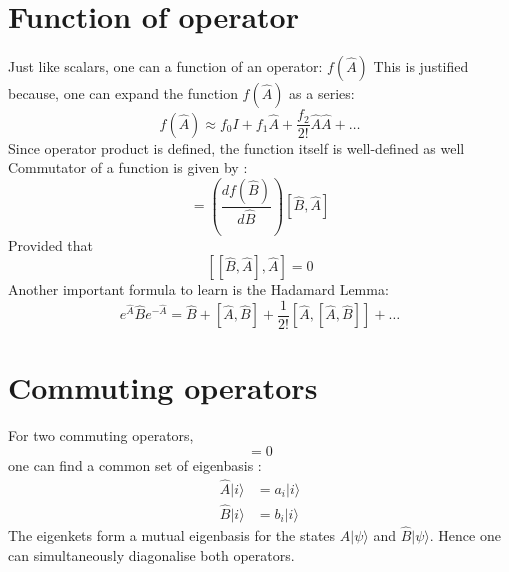  \section{Function of operator}
 Just like scalars, one can a function of an operator: $ f( \hat{A}) $ This is justified because, one can expand the function $ f( \hat{A}) $ as a series:
 \begin{equation}
 f( \hat{A}) \approx f_0I + f_1 \hat{A} + \frac{f_2}{2!} \hat{A}\hat{A} + \dots 
 \end{equation}
 Since operator product is defined, the function itself is well-defined as well\\
 Commutator of a function is given by :
 \begin{equation}
 [f(\hat{B}), \hat{A}] = \left( \dfrac{d f(\hat{B})}{d \hat{B}}\right)  [ \hat{B},\hat{A}]
 \end{equation}
 Provided that \[
 [ [ \hat{B},\hat{A}], \hat{A}] =0
 \]
 Another important formula to learn is the Hadamard Lemma:
 \begin{equation}
 e^{\hat{A}}\hat{B}e^{-\hat{A}}=\hat{B}+[\hat{A},\hat{B}]+\frac{1}{2!}[\hat{A},[\hat{A},\hat{B}]]+\dots
 \end{equation}
 \section{Commuting operators}
 For two commuting operators,
 \begin{equation}
 [\hat{A}, \hat{B}] =0
 \end{equation}
 one can find a common set of eigenbasis :
 \begin{align}
 \hat{A} | i\rangle &= a_i | i\rangle \\
 \hat{B} | i\rangle &= b_i | i\rangle 
 \end{align}
 The eigenkets form a mutual eigenbasis for the states $ \hat{A} | \psi\rangle$ and $ \hat{B} | \psi\rangle$. Hence one can simultaneously diagonalise both operators. 
